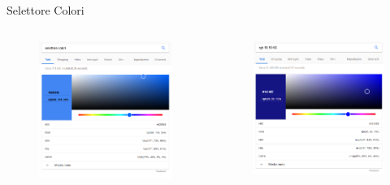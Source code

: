 \documentclass{beamer}
\begin{document}
\begin{frame}{Selettore Colori}
\begin{columns}
\begin{column}{0.5\linewidth}
\begin{figure}[h!]
\includegraphics[width=\linewidth]{immagini/selettore.png}
\end{figure}
\end{column}
\begin{column}{0.5\linewidth}
\begin{figure}[h!]
\includegraphics[width=\linewidth]{immagini/rgb.png}
\end{figure}
\end{column}
\end{columns}
\end{frame}
\end{document}
